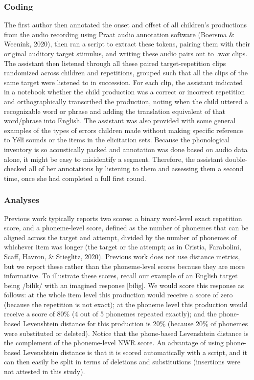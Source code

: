 \documentclass[
  american,
  ,man,floatsintext]{apa6}
\begin{document}
\hypertarget{coding}{%
\subsubsection{Coding}\label{coding}}

The first author then annotated the onset and offset of all children's productions from the audio recording using Praat audio annotation software (Boersma \& Weenink, 2020), then ran a script to extract these tokens, pairing them with their original auditory target stimulus, and writing these audio pairs out to .wav clips. The assistant then listened through all these paired target-repetition clips randomized across children and repetitions, grouped such that all the clips of the same target were listened to in succession. For each clip, the assistant indicated in a notebook whether the child production was a correct or incorrect repetition and orthographically transcribed the production, noting when the child uttered a recognizable word or phrase and adding the translation equivalent of that word/phrase into English. The assistant was also provided with some general examples of the types of errors children made without making specific reference to Yélî sounds or the items in the elicitation sets. Because the phonological inventory is so acoustically packed and annotation was done based on audio data alone, it might be easy to misidentify a segment. Therefore, the assistant double-checked all of her annotations by listening to them and assessing them a second time, once she had completed a full first round.

\hypertarget{analyses}{%
\subsubsection{Analyses}\label{analyses}}

Previous work typically reports two scores: a binary word-level exact repetition score, and a phoneme-level score, defined as the number of phonemes that can be aligned across the target and attempt, divided by the number of phonemes of whichever item was longer (the target or the attempt; as in Cristia, Farabolini, Scaff, Havron, \& Stieglitz, 2020). Previous work does not use distance metrics, but we report these rather than the phoneme-level scores because they are more informative. To illustrate these scores, recall our example of an English target being /bilik/ with an imagined response {[}bilig{]}. We would score this response as follows: at the whole item level this production would receive a score of zero (because the repetition is not exact); at the phoneme level this production would receive a score of 80\% (4 out of 5 phonemes repeated exactly); and the phone-based Levenshtein distance for this production is 20\% (because 20\% of phonemes were substituted or deleted). Notice that the phone-based Levenshtein distance is the complement of the phoneme-level NWR score. An advantage of using phone-based Levenshtein distance is that it is scored automatically with a script, and it can then easily be split in terms of deletions and substitutions (insertions were not attested in this study).
\end{document}
